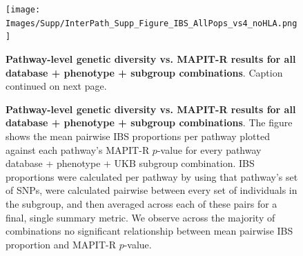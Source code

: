 \documentclass[12pt,a4paper]{article}
\begin{document}
\addtocounter{figure}{1}
\renewcommand{\thefigure}{\arabic{figure}}

\setlength{\footskip}{3cm}
\begin{figure}[htbp]
\centering
\vspace*{-2cm}
\texttt{[image: Images/Supp/InterPath\_Supp\_Figure\_IBS\_AllPops\_vs4\_noHLA.png]}
\caption[TBD]{\textbf{Pathway-level genetic diversity vs. MAPIT-R results for all database + phenotype + subgroup combinations}. Caption continued on next page.}
\label{InterPath-Supp-Figure-IBS-AllPops}
\end{figure}
\clearpage
\setlength{\footskip}{1cm}
\addtocounter{figure}{-1}

\begin{figure} [t!]
\caption[TBD]{\textbf{Pathway-level genetic diversity vs. MAPIT-R results for all database + phenotype + subgroup combinations}. The figure shows the mean pairwise IBS proportions per pathway plotted against each pathway's MAPIT-R $p$-value for every pathway database + phenotype + UKB subgroup combination. IBS proportions were calculated per pathway by using that pathway's set of SNPs, were calculated pairwise between every set of individuals in the subgroup, and then averaged across each of these pairs for a final, single summary metric. We observe across the majority of combinations no significant relationship between mean pairwise IBS proportion and MAPIT-R $p$-value.}
\label{InterPath-Supp-Figure-IBS-AllPops-Caption}
\end{figure}
\clearpage

\end{document}
